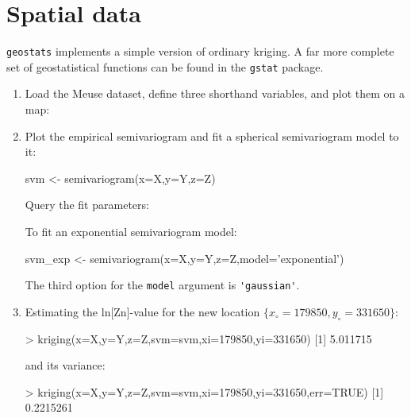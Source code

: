 \section{Spatial data}
\label{sec:R-spatial}

\texttt{geostats} implements a simple version of ordinary kriging.  A
far more complete set of geostatistical functions can be found in the
\texttt{gstat} package.

\begin{enumerate}

\item Load the Meuse dataset, define three shorthand variables, and
  plot them on a map:


\item Plot the empirical semivariogram and fit a spherical
  semivariogram model to it:

\begin{script}[firstnumber=6]
svm <- semivariogram(x=X,y=Y,z=Z)
\end{script}

Query the fit parameters:


To fit an exponential semivariogram model:

\begin{script}[firstnumber=6]
svm_exp <- semivariogram(x=X,y=Y,z=Z,model='exponential')
\end{script}

The third option for the \texttt{model} argument is \verb|'gaussian'|.

\item Estimating the ln[Zn]-value for the new location
  $\{x_,y_\}$:

\begin{console}
> kriging(x=X,y=Y,z=Z,svm=svm,xi=179850,yi=331650)
[1] 5.011715
\end{console}

\noindent and its variance:

\begin{console}
> kriging(x=X,y=Y,z=Z,svm=svm,xi=179850,yi=331650,err=TRUE)
[1] 0.2215261
\end{console}


\end{enumerate}

